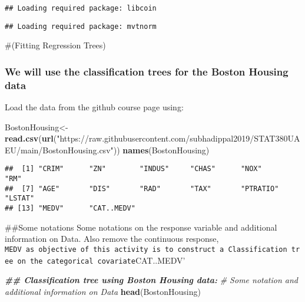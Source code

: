 \documentclass[
]{article}
\newenvironment{Shaded}{\begin{snugshade}}{\end{snugshade}}
\newcommand{\CommentTok}[1]{\textcolor[rgb]{0.56,0.35,0.01}{\textit{#1}}}
\newcommand{\DocumentationTok}[1]{\textcolor[rgb]{0.56,0.35,0.01}{\textbf{\textit{#1}}}}
\newcommand{\FunctionTok}[1]{\textcolor[rgb]{0.13,0.29,0.53}{\textbf{#1}}}
\newcommand{\NormalTok}[1]{#1}
\newcommand{\OtherTok}[1]{\textcolor[rgb]{0.56,0.35,0.01}{#1}}
\newcommand{\StringTok}[1]{\textcolor[rgb]{0.31,0.60,0.02}{#1}}
\begin{document}
\begin{verbatim}
## Loading required package: libcoin
\end{verbatim}

\begin{verbatim}
## Loading required package: mvtnorm
\end{verbatim}

\#(Fitting Regression Trees)

\hypertarget{we-will-use-the-classification-trees-for-the-boston-housing-data}{%
\subsubsection{We will use the classification trees for the Boston
Housing
data}\label{we-will-use-the-classification-trees-for-the-boston-housing-data}}

Load the data from the github course page using:

\begin{Shaded}
\begin{Highlighting}[]
\NormalTok{BostonHousing}\OtherTok{\textless{}{-}}\FunctionTok{read.csv}\NormalTok{(}\FunctionTok{url}\NormalTok{(}\StringTok{"https://raw.githubusercontent.com/subhadippal2019/STAT380UAEU/main/BostonHousing.csv"}\NormalTok{))}
\FunctionTok{names}\NormalTok{(BostonHousing)}
\end{Highlighting}
\end{Shaded}

\begin{verbatim}
##  [1] "CRIM"      "ZN"        "INDUS"     "CHAS"      "NOX"       "RM"       
##  [7] "AGE"       "DIS"       "RAD"       "TAX"       "PTRATIO"   "LSTAT"    
## [13] "MEDV"      "CAT..MEDV"
\end{verbatim}

\#\#Some notations Some notations on the response variable and
additional information on Data. Also remove the continuous response,
\texttt{MEDV\textquotesingle{}\ as\ objective\ of\ this\ activity\ is\ to\ construct\ a\ Classification\ tree\ on\ the\ categorical\ covariate}CAT..MEDV'

\begin{Shaded}
\begin{Highlighting}[]
\DocumentationTok{\#\# Classification tree using Boston Housing data: }
\CommentTok{\# Some notation and additional information on Data}
\FunctionTok{head}\NormalTok{(BostonHousing)}
\end{Highlighting}
\end{Shaded}
\end{document}
